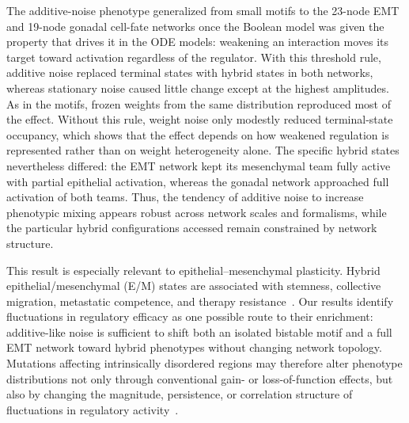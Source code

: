\documentclass[11pt]{article}
\begin{document}
The additive-noise phenotype generalized from small motifs to the 23-node EMT and 19-node gonadal cell-fate networks once the Boolean model was given the property that drives it in the ODE models: weakening an interaction moves its target toward activation regardless of the regulator. With this threshold rule, additive noise replaced terminal states with hybrid states in both networks, whereas stationary noise caused little change except at the highest amplitudes. As in the motifs, frozen weights from the same distribution reproduced most of the effect. Without this rule, weight noise only modestly reduced terminal-state occupancy, which shows that the effect depends on how weakened regulation is represented rather than on weight heterogeneity alone. The specific hybrid states nevertheless differed: the EMT network kept its mesenchymal team fully active with partial epithelial activation, whereas the gonadal network approached full activation of both teams. Thus, the tendency of additive noise to increase phenotypic mixing appears robust across network scales and formalisms, while the particular hybrid configurations accessed remain constrained by network structure.

This result is especially relevant to epithelial--mesenchymal plasticity. Hybrid epithelial/mesenchymal (E/M) states are associated with stemness, collective migration, metastatic competence, and therapy resistance~\cite{Pastushenko2019EMTMetastasis, jolly2015implications, pasani2020hybrid, Sahoo2021}. Our results identify fluctuations in regulatory efficacy as one possible route to their enrichment: additive-like noise is sufficient to shift both an isolated bistable motif and a full EMT network toward hybrid phenotypes without changing network topology. Mutations affecting intrinsically disordered regions may therefore alter phenotype distributions not only through conventional gain- or loss-of-function effects, but also by changing the magnitude, persistence, or correlation structure of fluctuations in regulatory activity~\cite{Kulkarni2023IntrinsicallyLater}.
\end{document}
